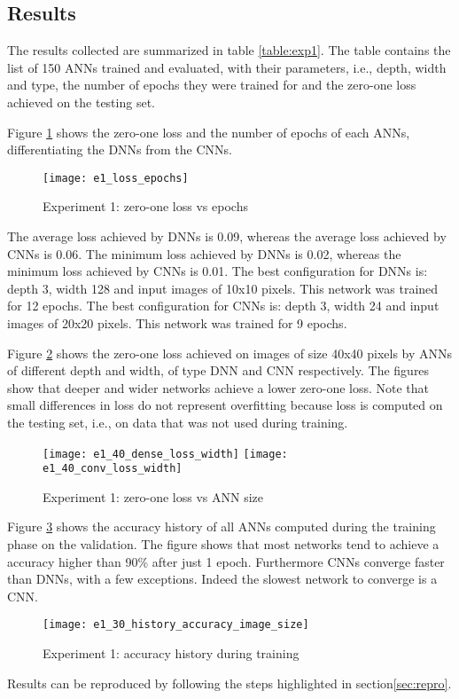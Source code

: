 \subsection{Results}
The results collected are summarized in table \ref{table:exp1}. The table contains the list of 150 ANNs trained and evaluated, with their parameters, i.e., depth, width and type, the number of epochs they were trained for and the zero-one loss achieved on the testing set.


Figure \ref{fig:e1_loss_epochs} shows the zero-one loss and the number of epochs of each ANNs, differentiating the DNNs from the CNNs.
\begin{figure}
\texttt{[image: e1\_loss\_epochs]}
\caption{Experiment 1: zero-one loss vs epochs}\label{fig:e1_loss_epochs}
\end{figure}
The average loss achieved by DNNs is 0.09, whereas the average loss achieved by CNNs is 0.06. The minimum loss achieved by DNNs is 0.02, whereas the minimum loss achieved by CNNs is 0.01. The best configuration for DNNs is: depth 3, width 128 and input images of 10x10 pixels. This network was trained for 12 epochs. The best configuration for CNNs is: depth 3, width 24 and input images of 20x20 pixels. This network was trained for 9 epochs.

Figure \ref{fig:e1_40_loss_width} shows the zero-one loss achieved on images of size 40x40 pixels by ANNs of different depth and width, of type DNN and CNN respectively. The figures show that deeper and wider networks achieve a lower zero-one loss. Note that small differences in loss do not represent overfitting because loss is computed on the testing set, i.e., on data that was not used during training.
\begin{figure}
\texttt{[image: e1\_40\_dense\_loss\_width]}
\texttt{[image: e1\_40\_conv\_loss\_width]}
\caption{Experiment 1: zero-one loss vs ANN size}\label{fig:e1_40_loss_width}
\end{figure}

Figure \ref{fig:e1_30_history_accuracy_image_size} shows the accuracy history of all ANNs computed during the training phase on the validation. The figure shows that most networks tend to achieve a accuracy higher than 90\% after just 1 epoch. Furthermore CNNs converge faster than DNNs, with a few exceptions. Indeed the slowest network to converge is a CNN.
\begin{figure}
\texttt{[image: e1\_30\_history\_accuracy\_image\_size]}
\caption{Experiment 1: accuracy history during training}\label{fig:e1_30_history_accuracy_image_size}
\end{figure}

Results can be reproduced by following the steps highlighted in section\ref{sec:repro}.
